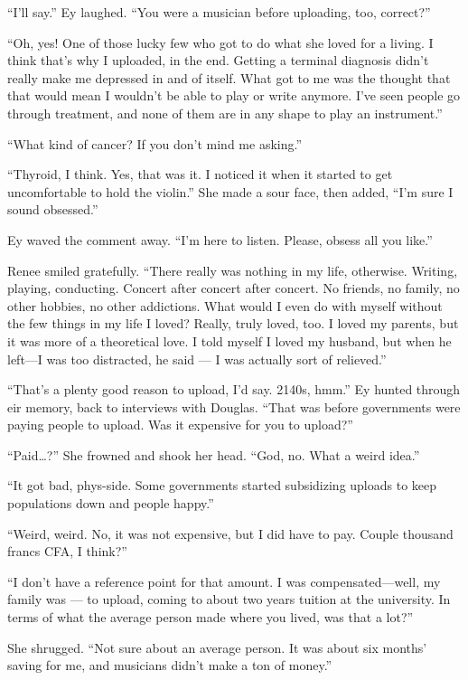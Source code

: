 ``I'll say.'' Ey laughed. ``You were a musician before uploading, too, correct?''

``Oh, yes! One of those lucky few who got to do what she loved for a living. I think that's why I uploaded, in the end. Getting a terminal diagnosis didn't really make me depressed in and of itself. What got to me was the thought that that would mean I wouldn't be able to play or write anymore. I've seen people go through treatment, and none of them are in any shape to play an instrument.''

``What kind of cancer? If you don't mind me asking.''

``Thyroid, I think. Yes, that was it. I noticed it when it started to get uncomfortable to hold the violin.'' She made a sour face, then added, ``I'm sure I sound obsessed.''

Ey waved the comment away. ``I'm here to listen. Please, obsess all you like.''

Renee smiled gratefully. ``There really was nothing in my life, otherwise. Writing, playing, conducting. Concert after concert after concert. No friends, no family, no other hobbies, no other addictions. What would I even do with myself without the few things in my life I loved? Really, truly loved, too. I loved my parents, but it was more of a theoretical love. I told myself I loved my husband, but when he left---I was too distracted, he said — I was actually sort of relieved.''\pagebreak

``That's a plenty good reason to upload, I'd say. 2140s, hmm.'' Ey hunted through eir memory, back to interviews with Douglas. ``That was before governments were paying people to upload. Was it expensive for you to upload?''

``Paid\ldots?'' She frowned and shook her head. ``God, no. What a weird idea.''

``It got bad, phys-side. Some governments started subsidizing uploads to keep populations down and people happy.''

``Weird, weird. No, it was not expensive, but I did have to pay. Couple thousand francs CFA, I think?''

``I don't have a reference point for that amount. I was compensated---well, my family was — to upload, coming to about two years tuition at the university. In terms of what the average person made where you lived, was that a lot?''

She shrugged. ``Not sure about an average person. It was about six months' saving for me, and musicians didn't make a ton of money.''

